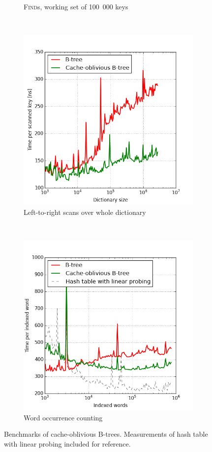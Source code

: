 \begin{figure}
\begin{subfigure}[t]{0.45\textwidth}
	\caption{\textsc{Find}s, working set of 100~000 keys}
\end{subfigure}
~
\begin{subfigure}[t]{0.45\textwidth}
	\includegraphics[width=\textwidth]{img/performance/cob-performance-5}
	\caption{Left-to-right scans over whole dictionary}
\end{subfigure}
~
\begin{subfigure}[t]{0.45\textwidth}
	\includegraphics[width=\textwidth]{img/performance/cob-performance-6}
	\caption{Word occurrence counting}
\end{subfigure}
\caption{Benchmarks of cache-oblivious B-trees.
	Measurements of hash table with linear probing included for reference.}
\label{fig:cob-performance}
\end{figure}

